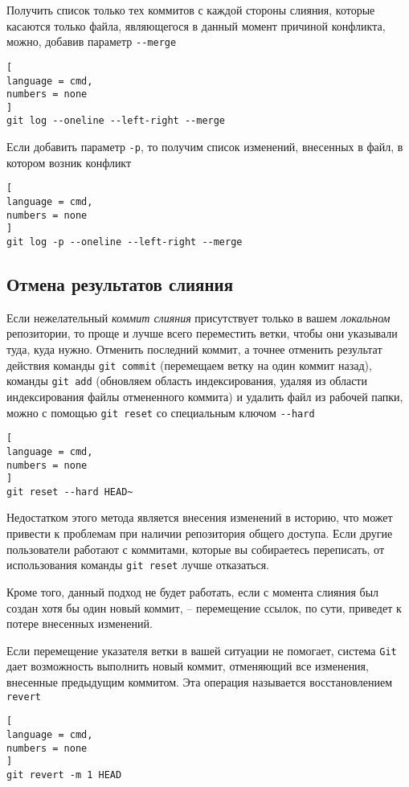 \documentclass[%
	11pt,
	a4paper,
	utf8,
		]{article}
\begin{document}
Получить список только тех коммитов с каждой стороны слияния, которые касаются только файла, являющегося в данный момент причиной конфликта, можно, добавив параметр \verb|--merge|
\begin{lstlisting}[
language = cmd,
numbers = none
]
git log --oneline --left-right --merge
\end{lstlisting}

Если добавить параметр \texttt{-p}, то получим список изменений, внесенных в файл, в котором возник конфликт
\begin{lstlisting}[
language = cmd,
numbers = none
]
git log -p --oneline --left-right --merge
\end{lstlisting}

\subsection{Отмена результатов слияния}

Если нежелательный \emph{коммит слияния} присутствует только в вашем \emph{локальном} репозитории, то проще и лучше всего переместить ветки, чтобы они указывали туда, куда нужно. Отменить последний коммит, а точнее отменить результат действия команды \texttt{git commit} (перемещаем ветку на один коммит назад), команды \texttt{git add} (обновляем область индексирования, удаляя из области индексирования файлы отмененного коммита) и удалить файл из рабочей папки, можно с помощью \texttt{git reset} со специальным ключом \verb|--hard|
\begin{lstlisting}[
language = cmd,
numbers = none
]
git reset --hard HEAD~
\end{lstlisting}

Недостатком этого метода является внесения изменений в историю, что может привести к проблемам при наличии репозитория общего доступа. Если другие пользователи работают с коммитами, которые вы собираетесь переписать, от использования команды \texttt{git reset} лучше отказаться.

Кроме того, данный подход не будет работать, если с момента слияния был создан хотя бы один новый коммит, -- перемещение ссылок, по сути, приведет к потере внесенных изменений.

Если перемещение указателя ветки в вашей ситуации не помогает, система \texttt{Git} дает возможность выполнить новый коммит, отменяющий все изменения, внесенные предыдущим коммитом. Эта операция называется восстановлением \texttt{revert}
\begin{lstlisting}[
language = cmd,
numbers = none
]
git revert -m 1 HEAD
\end{lstlisting}
\end{document}
